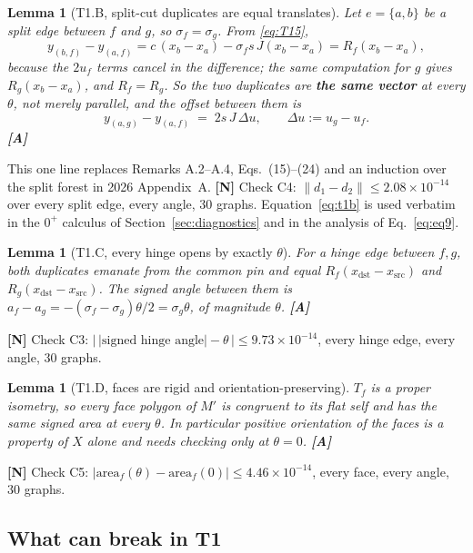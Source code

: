 \documentclass[11pt,a4paper]{article}
\newtheorem{lemma}[theorem]{Lemma}
\theoremstyle{definition}
\newcommand{\Mprime}{M'}
\begin{document}
\begin{lemma}[T1.B, split-cut duplicates are equal translates]
\label{lem:t1b}
Let $e=\{a,b\}$ be a split edge between $f$ and $g$, so $\sigma_f=\sigma_g$. From
\eqref{eq:T15},
\[
y_{(b,f)}-y_{(a,f)} = c\,(x_b-x_a) - \sigma_f s\,J(x_b-x_a) = R_f(x_b-x_a),
\]
because the $2u_f$ terms cancel in the difference; the same computation for $g$ gives
$R_g(x_b-x_a)$, and $R_f=R_g$. So the two duplicates are \textbf{the same vector} at every
$\theta$, not merely parallel, and the offset between them is
\begin{equation}
y_{(a,g)}-y_{(a,f)} \;=\; 2s\,J\,\Delta u , \qquad \Delta u:=u_g-u_f .
\label{eq:t1b}
\end{equation}
\textbf{[A]}
\end{lemma}

\noindent This one line replaces Remarks A.2--A.4, Eqs.~(15)--(24) and an induction over the
split forest in 2026 Appendix~A. \textbf{[N]} Check C4: $\|d_1-d_2\|\le2.08\times10^{-14}$
over every split edge, every angle, 30 graphs. Equation~\eqref{eq:t1b} is used verbatim in
the $0^+$ calculus of Section~\ref{sec:diagnostics} and in the analysis of
Eq.~\eqref{eq:eq9}.

\begin{lemma}[T1.C, every hinge opens by exactly $\theta$]
For a hinge edge between $f,g$, both duplicates emanate from the common pin and equal
$R_f(x_{\mathrm{dst}}-x_{\mathrm{src}})$ and $R_g(x_{\mathrm{dst}}-x_{\mathrm{src}})$. The
signed angle between them is $a_f-a_g=-(\sigma_f-\sigma_g)\theta/2=\sigma_g\theta$, of
magnitude $\theta$. \textbf{[A]}
\end{lemma}
\noindent\textbf{[N]} Check C3: $\bigl|\,|\text{signed hinge angle}|-\theta\,\bigr|\le
9.73\times10^{-14}$, every hinge edge, every angle, 30 graphs.

\begin{lemma}[T1.D, faces are rigid and orientation-preserving]
$T_f$ is a proper isometry, so every face polygon of $\Mprime$ is congruent to its flat self
and has the \emph{same signed area at every $\theta$}. In particular positive orientation of
the faces is a property of $X$ alone and needs checking only at $\theta=0$. \textbf{[A]}
\end{lemma}
\noindent\textbf{[N]} Check C5: $|\mathrm{area}_f(\theta)-\mathrm{area}_f(0)|\le
4.46\times10^{-14}$, every face, every angle, 30 graphs.

\subsection{What can break in T1}
\end{document}
